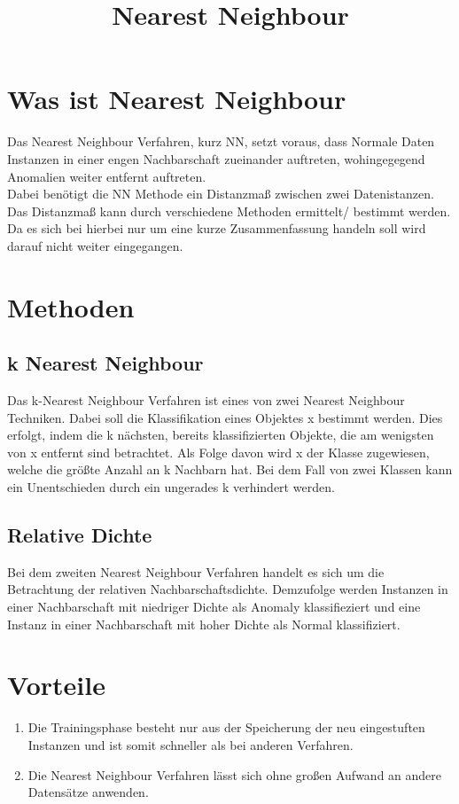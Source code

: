 \documentclass[a4paper,12pt]{article}
\title{Nearest Neighbour}
\begin{document}
\section{Was ist Nearest Neighbour}
Das Nearest Neighbour Verfahren, kurz NN, setzt voraus, dass Normale Daten Instanzen in einer engen Nachbarschaft zueinander auftreten,  wohingegegend Anomalien weiter entfernt auftreten. \\
Dabei benötigt die NN Methode ein Distanzmaß zwischen zwei Datenistanzen. Das Distanzmaß kann durch verschiedene Methoden ermittelt/ bestimmt werden. Da es sich bei hierbei nur um eine kurze Zusammenfassung handeln soll wird darauf nicht weiter eingegangen.
\section{Methoden}
\subsection{k Nearest Neighbour}
Das k-Nearest Neighbour Verfahren ist eines von zwei Nearest Neighbour Techniken. Dabei soll die Klassifikation eines Objektes x bestimmt werden. Dies erfolgt, indem die k nächsten, bereits klassifizierten Objekte, die am wenigsten von x entfernt sind betrachtet. Als Folge davon wird x der Klasse zugewiesen, welche die größte Anzahl an k Nachbarn hat. Bei dem Fall von zwei Klassen kann ein Unentschieden durch ein ungerades k verhindert werden. 
\subsection{Relative Dichte}
Bei dem zweiten Nearest Neighbour Verfahren handelt es sich um die  Betrachtung der relativen Nachbarschaftsdichte. Demzufolge werden Instanzen in einer Nachbarschaft mit niedriger Dichte als Anomaly klassifieziert und eine Instanz in einer Nachbarschaft mit hoher Dichte als Normal klassifiziert. 
\section{Vorteile}
\begin{center}
\begin{enumerate}
\item Die Trainingsphase besteht nur aus der Speicherung der neu eingestuften Instanzen und ist somit schneller als bei anderen Verfahren.
\item Die Nearest Neighbour Verfahren lässt sich ohne großen Aufwand an andere Datensätze anwenden.
\end{enumerate}
\end{center}
\end{document}
